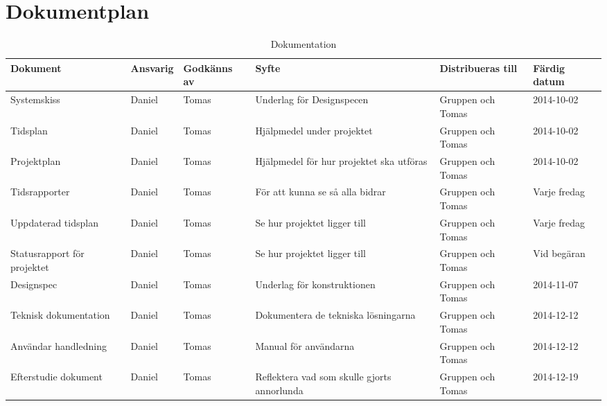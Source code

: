 \section{Dokumentplan}

\begin{table}[h]
	\centering
		\begin{tabularx}{\textwidth}{| p{22mm} | l | X | p{25mm} | X | l |}
			\hline
	\textbf{Dokument} & \textbf{Ansvarig} & \textbf{Godkänns av} & \textbf{Syfte} & \textbf{Distribueras till} & \textbf{Färdig datum} \\
			\hline

     {Systemskiss} & {Daniel} & {Tomas}& {Underlag för Designspecen} & {Gruppen och Tomas} & {2014-10-02} \\
      \hline
          {Tidsplan} & {Daniel} & {Tomas}& {Hjälpmedel under projektet} & {Gruppen och Tomas} & {2014-10-02} \\
      \hline
          {Projektplan} & {Daniel} & {Tomas}& {Hjälpmedel för hur projektet ska utföras} & {Gruppen och Tomas} & {2014-10-02} \\
      \hline
          {Tidsrapporter} & {Daniel} & {Tomas}& {För att kunna se så alla bidrar} & {Gruppen och Tomas} & {Varje fredag} \\
      \hline
                {Uppdaterad tidsplan} & {Daniel} & {Tomas}& {Se hur projektet ligger till} & {Gruppen och Tomas} & {Varje fredag} \\
      \hline
                      {Statusrapport för projektet} & {Daniel} & {Tomas}& {Se hur projektet ligger till} & {Gruppen och Tomas} & {Vid begäran} \\
      \hline
      
                {Designspec} & {Daniel} & {Tomas}& {Underlag för konstruktionen} & {Gruppen och Tomas} & {2014-11-07} \\
      \hline
                      {Teknisk 
                      dokumentation} & {Daniel} & {Tomas}& {Dokumentera de tekniska lösningarna} & {Gruppen och Tomas} & {2014-12-12} \\
      \hline
                            {Användar
                            handledning} & {Daniel} & {Tomas}& {Manual för användarna} & {Gruppen och Tomas} & {2014-12-12} \\
      \hline
  {Efterstudie
  dokument} & {Daniel} & {Tomas}& {Reflektera vad som skulle gjorts annorlunda} & {Gruppen och Tomas} & {2014-12-19} \\
      \hline
      
		\end{tabularx}
	\caption{Dokumentation} \label{dokumentation:tabell}
\end{table}